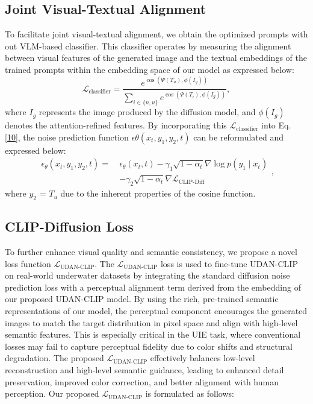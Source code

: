 \documentclass[3p,12pt,authoryear]{elsarticle}
\begin{document}
\subsection{Joint Visual-Textual Alignment}
To facilitate joint visual-textual alignment, we obtain the optimized prompts with out VLM-based classifier. This classifier operates by measuring the alignment between visual features of the generated image and the textual embeddings of the trained prompts within the embedding space of our model as expressed below:
\begin{equation}
\mathcal{L}_{\text{classifier}} = \frac{e^{\cos(\Psi(T_u), \phi(I_g))}}{\sum_{i \in \{n,u\}} e^{\cos(\Psi(T_i), \phi(I_g))}},
\label{14}
\end{equation}
where $I_g$ represents the image produced by the diffusion model, and \( \phi(I_g) \) denotes the attention-refined features.
By incorporating this $\mathcal{L}_{\text{classifier}}$ into Eq. \ref{10}, the noise prediction function $\epsilon\theta(x_t, y_1, y_2, t)$ can be reformulated and expressed below:
\begin{equation}
\begin{split}
\epsilon_{\theta}(x_t, y_1, y_2, t) =\ & \epsilon_{\theta}(x_t, t) 
- \gamma_1 \sqrt{1 - \bar{\alpha}_t} \nabla \log p(y_1 \mid x_t) \\
& - \gamma_2 \sqrt{1 - \bar{\alpha}_t} \nabla \mathcal{L}_{\text{CLIP-Diff}}
\end{split},
\label{15}
\end{equation}where $y_2$ = $T_u$ due to the inherent properties of the cosine function.
    
\subsection{CLIP-Diffusion Loss}
To further enhance visual quality and semantic consistency, we propose a novel loss function $\mathcal{L}_{\text{UDAN-CLIP}}$. The $\mathcal{L}_{\text{UDAN-CLIP}}$ loss is used to fine-tune UDAN-CLIP on real-world underwater datasets by integrating the standard diffusion noise prediction loss with a perceptual alignment term derived from the embedding of our proposed UDAN-CLIP model. By using the rich, pre-trained semantic representations of our model, the perceptual component encourages the generated images to match the target distribution in pixel space and align with high-level semantic features. This is especially critical in the UIE task, where conventional losses may fail to capture perceptual fidelity due to color shifts and structural degradation. The proposed $\mathcal{L}_{\text{UDAN-CLIP}}$ effectively balances low-level reconstruction and high-level semantic guidance, leading to enhanced detail preservation, improved color correction, and better alignment with human perception. Our proposed $\mathcal{L}_{\text{UDAN-CLIP}}$ is formulated as follows:   
\end{document}
